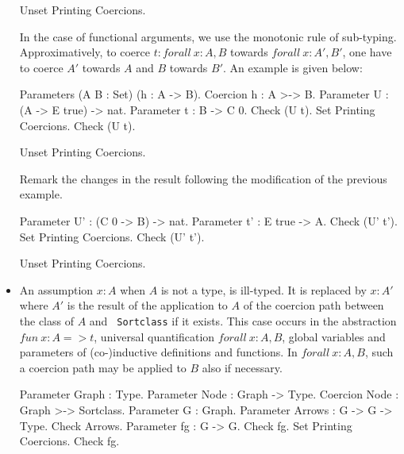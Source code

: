 \begin{itemize}
\begin{coq_eval}
Unset Printing Coercions.
\end{coq_eval}


  In the case of functional arguments, we use the monotonic rule of
sub-typing.  Approximatively, to coerce $t:forall~x:A, B$ towards
$forall~x:A',B'$, one have to coerce $A'$ towards $A$ and $B$ towards
$B'$. An example is given below:

\begin{coq_example}
Parameters (A B : Set) (h : A -> B).
Coercion h : A >-> B.
Parameter U : (A -> E true) -> nat.
Parameter t : B -> C 0.
Check (U t).
Set Printing Coercions.
Check (U t).
\end{coq_example}

\begin{coq_eval}
Unset Printing Coercions.
\end{coq_eval}

  Remark the changes in the result following the modification of the
previous example.

\begin{coq_example}
Parameter U' : (C 0 -> B) -> nat.
Parameter t' : E true -> A.
Check (U' t').
Set Printing Coercions.
Check (U' t').
\end{coq_example}

\begin{coq_eval}
Unset Printing Coercions.
\end{coq_eval}

\item An assumption $x:A$ when $A$ is not a type, is ill-typed.  It is
      replaced by $x:A'$ where $A'$ is the result of the application
      to $A$ of the coercion path between the class of $A$ and {\tt
      Sortclass} if it exists.  This case occurs in the abstraction
      $fun~ x:A => t$, universal quantification $forall~x:A, B$,
      global variables and parameters of (co-)inductive definitions
      and functions. In $forall~x:A, B$, such a coercion path may be
      applied to $B$ also if necessary.

\begin{coq_example}
Parameter Graph : Type.
Parameter Node : Graph -> Type.
Coercion Node : Graph >-> Sortclass.
Parameter G : Graph.
Parameter Arrows : G -> G -> Type.
Check Arrows.
Parameter fg : G -> G.
Check fg.
Set Printing Coercions.
Check fg.
\end{coq_example}


\end{itemize}

